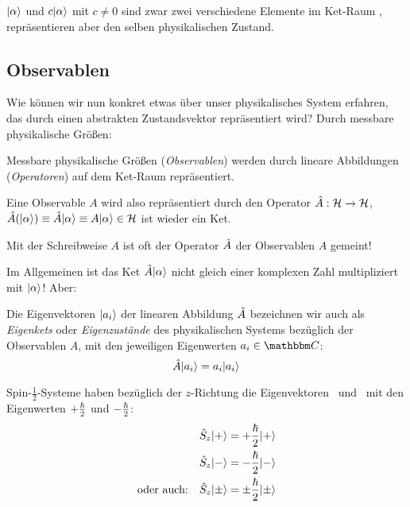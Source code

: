 \begin{post}
 $\keta$ und $c \keta$ mit $c \neq 0$ sind zwar zwei verschiedene Elemente im Ket-Raum \hs, repr\"asentieren aber den selben physikalischen Zustand.
\end{post}

\subsection{Observablen}
Wie k\"onnen wir nun konkret etwas \"uber unser physikalisches System erfahren, das durch einen abstrakten Zustandsvektor repr\"asentiert wird? Durch messbare physikalische Gr\"o\ss{}en:

\begin{post}
 Messbare physikalische Gr\"o\ss{}en (\emph{Observablen}) werden durch lineare Abbildungen (\emph{Operatoren}) auf dem Ket-Raum repr\"asentiert.
\end{post}
Eine Observable $A$ wird also repr\"asentiert durch den Operator $\hat{A}: \mathcal{H} \rightarrow \mathcal{H}$, $\op{A}( \keta) \equiv \op{A}\keta \equiv A \keta \in \hs$ ist wieder ein Ket.
\begin{konv}
 Mit der Schreibweise $A$ ist oft der Operator $\hat{A}$ der Observablen $A$ gemeint!
\end{konv}
Im Allgemeinen ist das Ket $\op{A} \keta$ nicht gleich einer komplexen Zahl multipliziert mit $\keta$! Aber:
\begin{defn}
Die Eigenvektoren $\ket{a_i}$ der linearen Abbildung $\hat{A}$ bezeichnen wir auch als \emph{Eigenkets} oder \emph{Eigenzust\"ande} des physikalischen Systems bez\"uglich der Observablen $A$, mit den jeweiligen Eigenwerten $a_i \in \comps$:
\begin{equation*}
 \op{A} \ket{a_i} = a_i \ket{a_i}
\end{equation*}
\end{defn}

\begin{bsp}
 Spin-$\frac{1}{2}$-Systeme haben bez\"uglich der $z$-Richtung die Eigenvektoren \szus\ und \szds\ mit den Eigenwerten $+\frac{\hbar}{2}$ und $-\frac{\hbar}{2}$:
 \begin{align*}
  \szop \szus &= + \hbarh \szus \\
  \szop \szds &= - \hbarh \szds \\
  \text{oder auch:} \quad \szop \szs &= \pm \hbarh \szs
 \end{align*}

\end{bsp}

